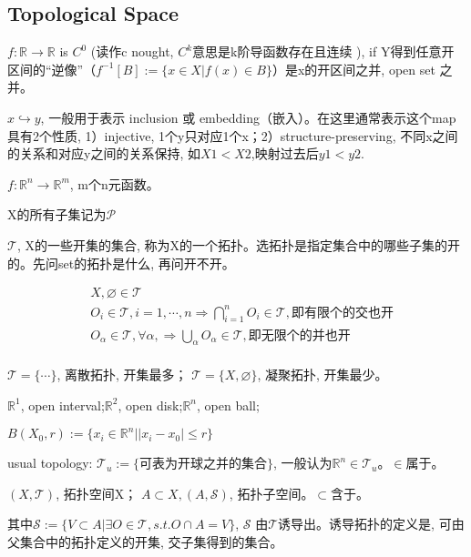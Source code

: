 \documentclass[UTF8]{../09-Mathematics}
\begin{document}
\subsection{Topological Space}


$f: \mathbb{R} \to \mathbb{R} $ is $C^0$ (读作c nought, $C^k$意思是k阶导函数存在且连续 ),  if Y得到任意开区间的“逆像”（$f^{-1}[B] := \{x \in X | f(x) \in B\}$）是x的开区间之并, open set 之并。

$x \hookrightarrow y$, 一般用于表示 inclusion 或 embedding（嵌入）。在这里通常表示这个map具有2个性质, 1）injective, 1个y只对应1个x；2）structure-preserving, 不同x之间的关系和对应y之间的关系保持, 如$X1 < X2$,映射过去后$y1 < y2$.

$f: \mathbb{R}^n \to \mathbb{R}^m $,  m个n元函数。

X的所有子集记为$\mathscr P$

$\mathscr T$, X的一些开集的集合, 称为X的一个拓扑。选拓扑是指定集合中的哪些子集的开的。先问set的拓扑是什么, 再问开不开。

\begin{equation}
    \begin{split}
    &X, \varnothing \in \mathscr T\\
    &O_i \in\mathscr T, i=1, \cdots, n \Longrightarrow \bigcap _{i=1}^n O_i  \in\mathscr T, 即有限个的交也开 \\
    &O_\alpha \in\mathscr T, \forall \alpha, \Longrightarrow \bigcup  _\alpha  O_\alpha \in\mathscr T,  即无限个的并也开 \\
    \end{split}
  \end{equation}


$\mathscr T = \{ \cdots \}$, 离散拓扑, 开集最多；
$\mathscr T = \{ X, \varnothing \}$, 凝聚拓扑, 开集最少。

$\mathbb{R}^1$, open interval;$\mathbb{R}^2$, open disk;$\mathbb{R}^n$, open ball;

$B(X_0, r) := \{ x_i \in \mathbb{R}^n |   |x_i - x_0| \leq r\}$

usual topology: $\mathscr T_u := \{ \mbox{可表为开球之并的集合}\}$, 一般认为$\mathbb{R}^n \in \mathscr T_u $。$\in$属于。

$(X, \mathscr T)$, 拓扑空间X；
$A \subset X,  (A, \mathscr S)$,  拓扑子空间。$ \subset $含于。

其中$\mathscr S := \{  V \subset A | \exists O \in \mathscr T, s.t. O \cap A = V\}$, $\mathscr S$ 由$\mathscr T$诱导出。诱导拓扑的定义是, 可由父集合中的拓扑定义的开集, 交子集得到的集合。
\end{document}
